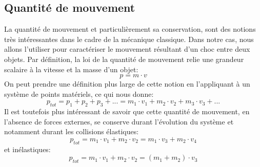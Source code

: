 \subsection{Quantité de mouvement}
La quantité de mouvement et particulièrement sa conservation, sont des notions très intéressantes dans le cadre de la mécanique classique. Dans notre cas, nous allons l'utiliser pour caractériser le mouvement résultant d'un choc entre deux objets.
Par définition, la loi de la quantité de mouvement relie une grandeur scalaire à la vitesse et la masse d'un objet:
\begin{equation}
    p = m \cdot v
\end{equation}
On peut prendre une définition plus large de cette notion en l'appliquant à un système de points matériels, ce qui nous donne:
\begin{equation}
    p_{tot} = p_1 + p_2 + p_3 + ... = m_1 \cdot v_1 + m_2 \cdot v_2 + m_3 \cdot v_3 + ...
\end{equation}
Il est toutefois plus intéressant de savoir que cette quantité de mouvement, en l'absence de forces externes, se conserve durant l'évolution du système et notamment durant les collisions élastiques:
\begin{equation}
    p_{tot} = m_1 \cdot v_1 + m_2 \cdot v_2 = m_1 \cdot v_3 + m_2 \cdot v_4
\end{equation}
et inélastiques:
\begin{equation}
    p_{tot} = m_1 \cdot v_1 + m_2 \cdot v_2 = (m_1 + m_2) \cdot v_3
\end{equation}

